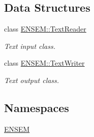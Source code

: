 \subsection*{Data Structures}
\begin{DoxyCompactItemize}
\item 
class \mbox{\hyperlink{classENSEM_1_1TextReader}{E\+N\+S\+E\+M\+::\+Text\+Reader}}
\begin{DoxyCompactList}\small\item\em Text input class. \end{DoxyCompactList}\item 
class \mbox{\hyperlink{classENSEM_1_1TextWriter}{E\+N\+S\+E\+M\+::\+Text\+Writer}}
\begin{DoxyCompactList}\small\item\em Text output class. \end{DoxyCompactList}\end{DoxyCompactItemize}
\subsection*{Namespaces}
\begin{DoxyCompactItemize}
\item 
 \mbox{\hyperlink{namespaceENSEM}{E\+N\+S\+EM}}
\end{DoxyCompactItemize}
